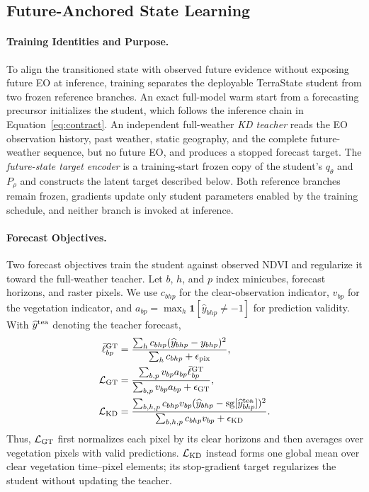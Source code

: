 \documentclass[letterpaper]{article} %
\begin{document}
\subsection{Future-Anchored State Learning}

\paragraph{Training Identities and Purpose.}
To align the transitioned state with observed future evidence without exposing
future EO at inference, training separates the deployable TerraState student
from two frozen reference branches. An exact full-model warm start from a
forecasting precursor initializes the student, which follows the inference chain in
Equation~\ref{eq:contract}. An independent full-weather \emph{KD teacher} reads
the EO observation history, past weather, static geography, and the complete future-weather
sequence, but no future EO, and produces a stopped forecast target. The
\emph{future-state target encoder} is a training-start frozen copy of the
student's $q_\theta$ and $P_\rho$ and constructs the latent target described
below. Both reference branches remain frozen, gradients update only student
parameters enabled by the training schedule, and neither branch is invoked at
inference.

\paragraph{Forecast Objectives.}
Two forecast objectives train the student against observed NDVI and regularize
it toward the full-weather teacher. Let $b$, $h$, and $p$ index minicubes,
forecast horizons, and raster pixels. We use $c_{bhp}$ for the clear-observation
indicator, $v_{bp}$ for the vegetation indicator, and
$a_{bp}=\max_h\mathbf 1[\widehat y_{bhp}\ne-1]$ for prediction validity.
With $\widehat y^{\rm tea}$ denoting the teacher forecast,
\begin{equation}
\begin{aligned}
\bar\ell^{\rm GT}_{bp}
&=\frac{\sum_h c_{bhp}(\widehat y_{bhp}-y_{bhp})^2}
{\sum_h c_{bhp}+\epsilon_{\rm pix}},\\
\mathcal L_{\rm GT}
&=\frac{\sum_{b,p}v_{bp}a_{bp}\bar\ell^{\rm GT}_{bp}}
{\sum_{b,p}v_{bp}a_{bp}+\epsilon_{\rm GT}},\\
\mathcal L_{\rm KD}
&=\frac{\sum_{b,h,p}c_{bhp}v_{bp}
(\widehat y_{bhp}-\operatorname{sg}[\widehat y^{\rm tea}_{bhp}])^2}
{\sum_{b,h,p}c_{bhp}v_{bp}+\epsilon_{\rm KD}}.
\end{aligned}
\label{eq:forecastlosses}
\end{equation}
Thus, $\mathcal L_{\rm GT}$ first normalizes each pixel by its clear horizons
and then averages over vegetation pixels with valid predictions.
$\mathcal L_{\rm KD}$ instead forms one global mean over clear vegetation
time--pixel elements; its stop-gradient target regularizes the student without
updating the teacher.
\end{document}
